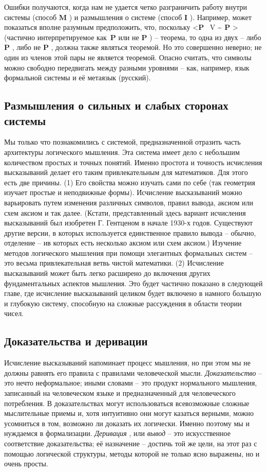 \documentclass[../main.tex]{subfiles}
\begin{document}
Ошибки получаются, когда нам не удается четко разграничить работу внутри системы (способ \textbf{M} ) и размышления о системе (способ \textbf{I} ). Например, может показаться вполне разумным предположить, что, поскольку \textless{}\textbf{P} ~V \textbf{\textasciitilde{} P} \textgreater{} (частично интерпретируемое как~\textbf{P} или не \textbf{P} ) \--- теорема, то одна из двух \--- либо \textbf{P} , либо не \textbf{P} , должна также являться теоремой. Но это совершенно неверно; не один из членов этой пары не является теоремой. Опасно считать, что символы можно свободно передвигать между разными уровнями \--- как, например, язык формальной системы и её метаязык (русский).


\subsection{Размышления о сильных и слабых сторонах системы}

Мы только что познакомились с системой, предназначенной отразить часть архитектуры логического мышления. Эта система имеет дело с небольшим количеством простых и точных понятий. Именно простота и точность исчисления высказываний делает его таким привлекательным для математиков. Для этого есть две причины. (1) Его свойства можно изучать сами по себе (так геометрия изучает простые и неподвижные формы). Исчисление высказываний можно варьировать путем изменения различных символов, правил вывода, аксиом или схем аксиом и так далее. (Кстати, представленный здесь вариант исчисления высказываний был изобретен Г. Гентценом в начале 1930-х годов. Существуют другие версии, в которых используется единственное правило вывода \--- обычно, отделение \--- ив которых есть несколько аксиом или схем аксиом.) Изучение методов логического мышления при помощи элегантных формальных систем \--- это весьма привлекательная ветвь чистой математики. (2) Исчисление высказываний может быть легко расширено до включения других фундаментальных аспектов мышления. Это будет частично показано в следующей главе, где исчисление высказываний целиком будет включено в намного большую и глубокую систему, способную на сложные рассуждения в области теории чисел.


\subsection{Доказательства и деривации}

Исчисление высказываний напоминает процесс мышления, но при этом мы не должны равнять его правила с правилами человеческой мысли. \emph{Доказательство} \--- это нечто неформальное; иными словами \--- это продукт нормального мышления, записанный на человеческом языке и предназначенный для человеческого потребления. В доказательствах могут использоваться всевозможные сложные мыслительные приемы и, хотя интуитивно они могут казаться верными, можно усомниться в том, возможно ли доказать их логически. Именно поэтому мы и нуждаемся в формализации. \emph{Деривация} , или \emph{вывод} \--- это искусственное соответствие доказательства; её назначение \--- достичь той же цели, на этот раз с помощью логической структуры, методы которой не только ясно выражены, но и очень просты.
\end{document}
